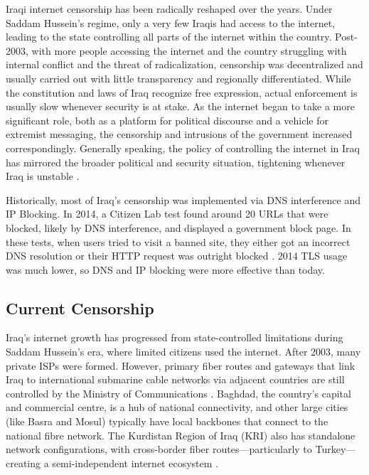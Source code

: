 Iraqi internet censorship has been radically reshaped over the years. Under Saddam Hussein's regime, only a very few Iraqis had access to the internet, leading to the state controlling all parts of the internet within the country. Post-2003, with more people accessing the internet and the country struggling with internal conflict and the threat of radicalization, censorship was decentralized and usually carried out with little transparency and regionally differentiated. While the constitution and laws of Iraq recognize free expression, actual enforcement is usually slow whenever security is at stake. As the internet began to take a more significant role, both as a platform for political discourse and a vehicle for extremist messaging, the censorship and intrusions of the government increased correspondingly. Generally speaking, the policy of controlling the internet in Iraq has mirrored the broader political and security situation, tightening whenever Iraq is unstable \cite{freedomhouseIraqFreedom}.

Historically, most of Iraq's censorship was implemented via DNS interference and IP Blocking. In 2014, a Citizen Lab test found around 20 URLs that were blocked, likely by DNS interference, and displayed a government block page. In these tests, when users tried to visit a banned site, they either got an incorrect DNS resolution or their HTTP request was outright blocked \cite{citizenlabIraqPastCensorship}. 2014 TLS usage was much lower, so DNS and IP blocking were more effective than today. 

\subsection{Current Censorship}

Iraq's internet growth has progressed from state-controlled limitations during Saddam Hussein's era, where limited citizens used the internet. After 2003, many private ISPs were formed. However, primary fiber routes and gateways that link Iraq to international submarine cable networks via adjacent countries are still controlled by the Ministry of Communications \cite{IraqCMC}. Baghdad, the country's capital and commercial centre, is a hub of national connectivity, and other large cities (like Basra and Mosul) typically have local backbones that connect to the national fibre network. The Kurdistan Region of Iraq (KRI) also has standalone network configurations, with cross-border fiber routes—particularly to Turkey—creating a semi-independent internet ecosystem \cite{freedomhouseIraqFreedom}. 

